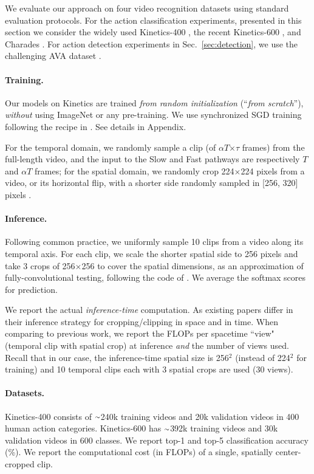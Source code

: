 \documentclass[10pt,twocolumn,letterpaper]{article}
\newcommand{\sref}[1]{Sec.~\ref{#1}}
\newcommand{\app}{\raise.17ex\hbox{$\scriptstyle\sim$}}
\def\x{$\times$}
\renewcommand{\omega}{\alpha}
\begin{document}
	We evaluate our approach on four video recognition datasets using standard evaluation protocols. For the action classification experiments, presented in this section we consider the widely used Kinetics-400  \cite{Kay2017}, the recent Kinetics-600 \cite{Carreira2018}, and Charades \cite{Sigurdsson2016}. For action detection experiments in \sref{sec:detection}, we use the challenging AVA dataset \cite{Gu2018}. 
	
		\paragraph{Training.} Our models on Kinetics are trained \emph{from random initialization} (``\emph{from scratch}''), \emph{without} using ImageNet \cite{Deng2009} or any pre-training. We use synchronized SGD training following the recipe in \cite{Goyal2017}. See details in Appendix.
	
	For the temporal domain, we randomly sample a clip (of $\alpha T$\x$\tau$ frames) from the full-length video, and the input to the Slow and Fast pathways are respectively $T$ and $\omega T$ frames; for the spatial domain, we randomly crop 224\x224 pixels from a video, or its horizontal flip, with a shorter side randomly sampled in [256, 320] pixels \cite{Simonyan2015,Wang2018}. 
 
	\paragraph{Inference.}  Following common practice, we uniformly sample 10 clips from a video along its temporal axis.
	For each clip, we scale the shorter spatial side to 256 pixels and take 3 crops of 256\x256 to cover the spatial dimensions, as an approximation of fully-convolutional testing, following the code of \cite{Wang2018}. We average the softmax scores for prediction.
	
	We report the actual \emph{inference-time} computation. As {existing papers differ in their inference strategy for cropping/clipping in space and in time}. When comparing to previous work, we report the FLOPs per spacetime ``view" (temporal clip with spatial crop) at inference \emph{and} the number of views used. Recall that in our case, the inference-time spatial size is 256$^2$ (instead of 224$^2$ for training) and 10 temporal clips each with 3 spatial crops are used (30 views).

	\paragraph{Datasets.} Kinetics-400 \cite{Kay2017} consists of $\app$240k training videos and 20k validation videos in 400 human action categories.
Kinetics-600 \cite{Carreira2018} has $\app$392k training videos and 30k validation videos in 600 classes. 
We report top-1 and top-5 classification accuracy (\%). We report the computational cost (in FLOPs) of a single, spatially center-cropped clip.
	
\end{document}
